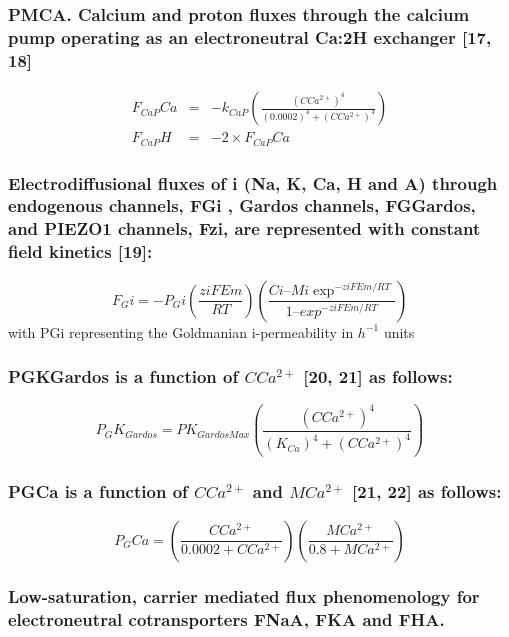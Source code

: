 \documentclass[a4paper]{article}
\newcommand{\med}[1]{M#1}
\newcommand{\cell}[1]{C#1}
\newcommand{\MCatp}{\med{Ca^{2+}}}
\newcommand{\KCa}{K_{Ca}}
\newcommand{\CCatp}{\cell{Ca^{2+}}}
\newcommand{\CCa}{\cell{Ca}}
\newcommand{\F}[2]{F_{#1}#2}
\newcommand{\kk}[2]{k_{#1}#2}
\begin{document}
\subsubsection{PMCA. Calcium and proton fluxes through the calcium pump operating as an electroneutral Ca:2H exchanger  [17, 18]}

\setcounter{equation}{0}
\renewcommand{\theequation}{12.\alph{equation}}

\begin{eqnarray}
\F{CaP}{Ca} &=& -\kk{CaP}{}\left(\frac{(\CCatp)^4}{(0.0002)^4 + (\CCa^{2+})^4}\right)\\
\F{CaP}{H} &=& -2\times\F{CaP}{Ca}
\end{eqnarray}

\subsubsection{Electrodiffusional fluxes of i (Na, K, Ca, H and A) through endogenous channels, FGi , Gardos channels, FGGardos, and PIEZO1 channels, Fzi, are represented with constant field kinetics [19]: }

\setcounter{equation}{12}
\renewcommand{\theequation}{\arabic{equation}}
\begin{equation}
\F{G}{i} = -P_{G}i\left(\frac{ziFEm}{RT}\right)\left(\frac{Ci – Mi\exp^{-ziFEm/RT}}{1 – exp^{-ziFEm/RT}}\right)
\end{equation}
with PGi representing the Goldmanian i-permeability in $h^{-1}$ units

\subsubsection{PGKGardos is a function of $CCa^{2+}$ [20, 21] as follows:}
\begin{equation}
P_{G}K_{Gardos} = PK_{GardosMax}\left(\frac{(\CCatp)^4}{(\KCa)^4 + (\CCatp)^4}\right)
\end{equation}

\subsubsection{PGCa is a function of $CCa^{2+}$ and $MCa^{2+}$ [21, 22] as follows:}
\begin{equation}
P_{G}Ca = \left(\frac{\CCatp}{0.0002 + \CCatp}\right)\left(\frac{\MCatp}{0.8 + \MCatp}\right)
\end{equation}

\subsubsection{Low-saturation, carrier mediated flux phenomenology for electroneutral cotransporters FNaA, FKA and FHA.}
\end{document}
